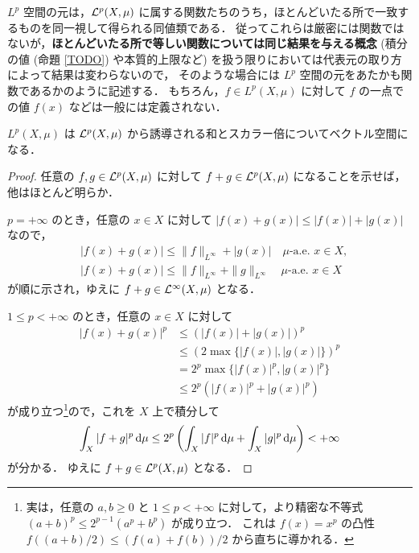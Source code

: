 \begin{remark}
    $L^p$ 空間の元は，$\mathcal{L}^p(X,\mu)$ に属する関数たちのうち，ほとんどいたる所で一致するものを同一視して得られる同値類である．
    従ってこれらは厳密には関数ではないが，\textbf{ほとんどいたる所で等しい関数については同じ結果を与える概念}
    (積分の値 (命題 \ref{TODO}) や本質的上限など) を扱う限りにおいては代表元の取り方によって結果は変わらないので，
    そのような場合には $L^p$ 空間の元をあたかも関数であるかのように記述する．
    もちろん，$f\in L^p(X,\mu)$ に対して $f$ の一点での値 $f(x)$ などは一般には定義されない．
\end{remark}

\begin{proposition}
    $L^p(X,\mu)$ は $\mathcal{L}^p(X,\mu)$ から誘導される和とスカラー倍についてベクトル空間になる．
\end{proposition}

\begin{proof}
    任意の $f,g\in\mathcal{L}^p(X,\mu)$ に対して $f+g\in\mathcal{L}^p(X,\mu)$ になることを示せば，他はほとんど明らか．

    $p=+\infty$ のとき，任意の $x\in X$ に対して $|f(x)+g(x)|\le|f(x)|+|g(x)|$ なので，
    \begin{align*}
        &|f(x)+g(x)|\le\|f\|_{L^\infty}+|g(x)|\quad\text{$\mu$-a.e.\ $x\in X$},\\
        &|f(x)+g(x)|\le\|f\|_{L^\infty}+\|g\|_{L^\infty}\quad\text{$\mu$-a.e.\ $x\in X$}
    \end{align*}
    が順に示され，ゆえに $f+g\in\mathcal{L}^\infty(X,\mu)$ となる．

    $1\le p<+\infty$ のとき，任意の $x\in X$ に対して
    \begin{align*}
        |f(x)+g(x)|^p
        &\le(|f(x)|+|g(x)|)^p\\
        &\le(2\max\{|f(x)|,|g(x)|\})^p\\
        &=2^p\max\{|f(x)|^p,|g(x)|^p\}\\
        &\le2^p(|f(x)|^p+|g(x)|^p)
    \end{align*}
    が成り立つ\footnote{
        実は，任意の $a,b\ge0$ と $1\le p<+\infty$ に対して，より精密な不等式 $(a+b)^p\le2^{p-1}(a^p+b^p)$ が成り立つ．
        これは $f(x)=x^p$ の凸性 $f((a+b)/2)\le(f(a)+f(b))/2$ から直ちに導かれる．
    }ので，これを $X$ 上で積分して
    \begin{align*}
        \int_X|f+g|^p\,\mathrm{d}\mu
        \le2^p\left(\int_X|f|^p\,\mathrm{d}\mu+\int_X|g|^p\,\mathrm{d}\mu\right)
        <+\infty
    \end{align*}
    が分かる．
    ゆえに $f+g\in\mathcal{L}^p(X,\mu)$ となる．
\end{proof}

